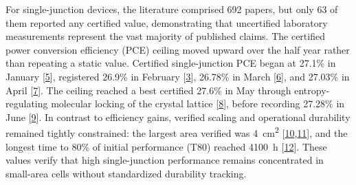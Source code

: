 \documentclass[
  11pt,
]{article}
\begin{document}
For single-junction devices, the literature comprised 692 papers, but
only 63 of them reported any certified value, demonstrating that
uncertified laboratory measurements represent the vast majority of
published claims. The certified power conversion efficiency (PCE)
ceiling moved upward over the half year rather than repeating a static
value. Certified single-junction PCE began at 27.1\% in January
{[}\href{https://doi.org/10.1002/adma.202517596}{5}{]}, registered
26.9\% in February
{[}\href{https://doi.org/10.1038/s41560-026-01993-z}{3}{]}, 26.78\% in
March {[}\href{https://doi.org/10.1002/adma.202520432}{6}{]}, and
27.03\% in April
{[}\href{https://doi.org/10.1038/s41467-026-72097-1}{7}{]}. The ceiling
reached a best certified 27.6\% in May through entropy-regulating
molecular locking of the crystal lattice
{[}\href{https://doi.org/10.1126/science.aeb9953}{8}{]}, before
recording 27.28\% in June
{[}\href{https://doi.org/10.1126/sciadv.aef6596}{9}{]}. In contrast to
efficiency gains, verified scaling and operational durability remained
tightly constrained: the largest area verified was
\qty{4}{\centi\meter\squared}
{[}\href{https://doi.org/10.1002/adma.73036}{10},\href{https://doi.org/10.1021/acsami.5c23126}{11}{]},
and the longest time to 80\% of initial performance (T80) reached
\qty{4100}{\hour} {[}\href{https://doi.org/10.1002/adfm.76110}{12}{]}.
These values verify that high single-junction performance remains
concentrated in small-area cells without standardized durability
tracking.
\end{document}
